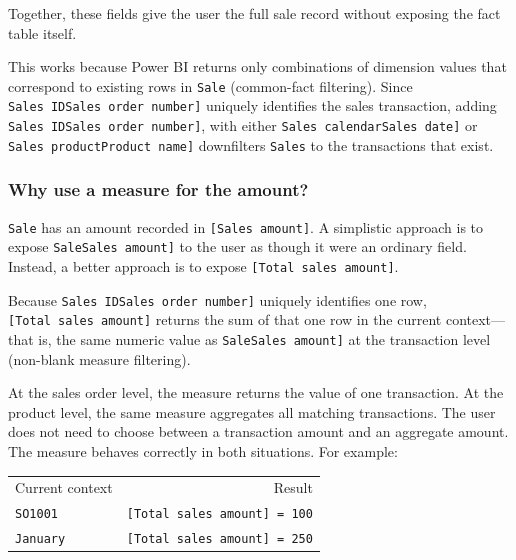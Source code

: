 \documentclass[10pt,openany,10pt]{book}
\newcounter{none}
\let\podeToprule\toprule
\let\podeMidrule\midrule
\let\podeBottomrule\bottomrule
\renewcommand{\toprule}{\arrayrulecolor{pbiGrid}\podeToprule}
\renewcommand{\midrule}{\arrayrulecolor{pbiGrid}\podeMidrule}
\renewcommand{\bottomrule}{\arrayrulecolor{pbiGrid}\podeBottomrule}
\begin{document}
Together, these fields give the user the full sale record without
exposing the fact table itself.

This works because Power BI returns only combinations of dimension
values that correspond to existing rows in
\texttt{\textquotesingle{}Sale\textquotesingle{}} (common-fact
filtering). Since
\texttt{\textquotesingle{}Sales\ ID\textquotesingle{}{[}Sales\ order\ number{]}}
uniquely identifies the sales transaction, adding
\texttt{\textquotesingle{}Sales\ ID\textquotesingle{}{[}Sales\ order\ number{]}},
with either
\texttt{\textquotesingle{}Sales\ calendar\textquotesingle{}{[}Sales\ date{]}}
or
\texttt{\textquotesingle{}Sales\ product\textquotesingle{}{[}Product\ name{]}}
downfilters \texttt{\textquotesingle{}Sales\textquotesingle{}} to the
transactions that exist.

\subsubsection{Why use a measure for the
amount?}\label{why-use-a-measure-for-the-amount}

\texttt{\textquotesingle{}Sale\textquotesingle{}} has an amount recorded
in \texttt{{[}Sales\ amount{]}}. A simplistic approach is to expose
\texttt{\textquotesingle{}Sale\textquotesingle{}{[}Sales\ amount{]}} to
the user as though it were an ordinary field. Instead, a better approach
is to expose \texttt{{[}Total\ sales\ amount{]}}.

Because
\texttt{\textquotesingle{}Sales\ ID\textquotesingle{}{[}Sales\ order\ number{]}}
uniquely identifies one row, \texttt{{[}Total\ sales\ amount{]}} returns
the sum of that one row in the current context---that is, the same
numeric value as
\texttt{\textquotesingle{}Sale\textquotesingle{}{[}Sales\ amount{]}} at
the transaction level (non-blank measure filtering).

At the sales order level, the measure returns the value of one
transaction. At the product level, the same measure aggregates all
matching transactions. The user does not need to choose between a
transaction amount and an aggregate amount. The measure behaves
correctly in both situations. For example:

{\def\LTcaptype{none} %
\begin{longtable}[]{@{}lr@{}}
\toprule\noalign{}
Current context & Result \\
\midrule\noalign{}
\endhead
\bottomrule\noalign{}
\endlastfoot
\texttt{SO1001} & \texttt{{[}Total\ sales\ amount{]}\ =\ 100} \\
\texttt{January} & \texttt{{[}Total\ sales\ amount{]}\ =\ 250} \\
\end{longtable}
}
\end{document}
